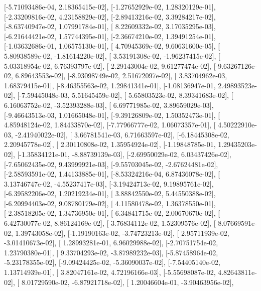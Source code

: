 \documentclass{article}
\begin{document}
       [-5.71093486e-04,  2.18365415e-02],
       [-1.27652929e-02,  1.28320129e-01],
       [-2.33209816e-02,  4.23158829e-02],
       [-2.89413216e-02,  3.39284217e-02],
       [-8.63740947e-02,  1.07991784e-01],
       [ 8.22609332e-02,  3.17035295e-03],
       [-6.21644421e-02,  1.57744395e-01],
       [-2.36674210e-02,  1.39491254e-01],
       [-1.03632686e-01,  1.06575130e-01],
       [ 4.70945369e-02,  9.60631600e-05],
       [ 5.80938589e-02, -1.81614220e-02],
       [ 3.53191308e-02, -1.96237415e-02],
       [ 5.03318954e-02,  6.76393797e-02],
       [ 2.29143004e-02,  9.61277474e-02],
       [-9.63267126e-02,  6.89643553e-02],
       [-8.93098749e-02,  2.51672097e-02],
       [ 3.83704962e-03,  1.68379415e-01],
       [-8.46355563e-02,  1.29841341e-01],
       [-1.08136947e-01,  2.49893523e-02],
       [-7.59445048e-03,  5.51645459e-02],
       [ 5.65803523e-02,  8.39341683e-02],
       [ 6.16063752e-02, -3.52393288e-03],
       [ 6.69771985e-02,  3.89659029e-03],
       [-9.46643513e-03,  1.01665048e-01],
       [-9.39126809e-02,  1.50352473e-01],
       [ 4.85948124e-02,  1.84433870e-02],
       [-7.77966777e-02,  1.06073357e-01],
       [ 4.50222910e-03, -2.41940022e-02],
       [ 3.66781541e-03,  6.71663597e-02],
       [-6.18445308e-02,  2.20945778e-02],
       [ 2.30110808e-02,  1.35954924e-02],
       [-1.19848785e-01,  1.29435203e-02],
       [-1.35834121e-01, -8.88739139e-03],
       [-2.69950029e-02,  6.03437426e-02],
       [-7.65062435e-02,  9.43999921e-03],
       [-9.55703045e-02, -2.67624481e-02],
       [-2.58593591e-02,  1.44133885e-01],
       [-8.53324216e-04,  6.87436078e-02],
       [ 3.13746747e-02, -4.55237417e-03],
       [-3.19424713e-02,  9.19895761e-02],
       [-6.39582206e-02,  1.20219234e-01],
       [ 3.88842550e-02,  5.44550388e-02],
       [-6.20994403e-02,  9.08780179e-02],
       [ 4.11580478e-02,  1.36378550e-01],
       [-2.38518205e-02,  1.34736950e-01],
       [ 6.34841715e-02,  2.00670670e-02],
       [ 6.42730077e-02,  8.86124169e-02],
       [ 3.76834112e-02,  1.52309576e-02],
       [ 8.07669591e-02,  1.39743058e-02],
       [-1.19190163e-02, -3.74723213e-02],
       [ 2.95711939e-02, -3.01410673e-02],
       [ 1.28993281e-01,  6.96029988e-02],
       [-2.70751754e-02,  1.23790380e-01],
       [ 9.33704293e-02, -3.87989232e-03],
       [-5.87458964e-02, -5.23178355e-02],
       [-9.09424425e-02, -5.36090037e-02],
       [-7.54405140e-02,  1.13714939e-01],
       [ 3.82047161e-02,  4.72196166e-03],
       [-5.55698087e-02,  4.82643811e-02],
       [ 8.01729590e-02, -6.87921718e-02],
       [ 1.20046604e-01, -3.90463956e-02],
\end{document}
